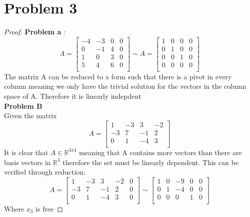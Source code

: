 \documentclass[12pt,a4paper]{article}
\newcommand{\R}{\mathbb{R}}
\begin{document}
\section*{Problem 3}
\begin{proof}
  \textbf{Problem a }:\\
  \[
  A=\begin{bmatrix}
    -4&-3&0&0\\
    0&-1&4&0\\
    1&0&3&0\\
    5&4&6&0\\
  \end{bmatrix}
  \sim
  A=\begin{bmatrix}
    1&0&0&0\\
    0&1&0&0\\
    0&0&1&0\\
    0&0&0&0\\
  \end{bmatrix}
  \]
  The matrix A can be reduced to a form such that there is a pivot in every column meaning we only have the trivial solution for the vectors in the column space of A. Therefore it is linearly indepdent\\
  \textbf{Problem B}\\
  Given the matrix
  \[

    A=\begin{bmatrix}
      1& -3&3&-2\\
      -3&7&-1&2\\
      0&1&-4&3\\
  \end{bmatrix}
  \]
  It is clear that $A \in \R^{3x4}$ meaning that A contains more vectors than there are basis vectors in $\R^3$ therefore the set must be linearly dependent. This can be verified through reduction:
  \[
  A=\begin{bmatrix}
    1& -3&3&-2&0\\
    -3&7&-1&2&0\\
    0&1&-4&3&0\\
  \end{bmatrix} \sim
  \begin{bmatrix}
    1& 0&-9&0&0\\
    0&1&-4&0&0\\
    0&0&0&1&0\\
  \end{bmatrix}
    \]
    Where $x_3$ is free
\end{proof}\\
\end{document}
